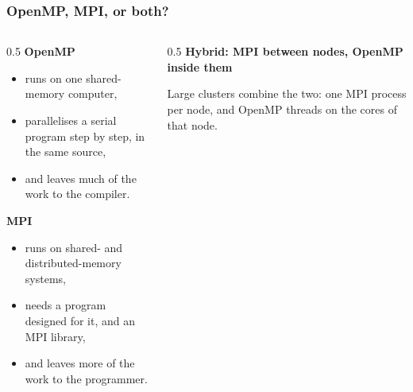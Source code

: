\begin{frame}
  \frametitle{OpenMP, MPI, or both?}
  \begin{columns}[T]
    \begin{column}{0.5\textwidth}
      \textbf{OpenMP}
      \begin{itemize}
        \item runs on one shared-memory computer,
        \item parallelises a serial program step by step, in the same source,
        \item and leaves much of the work to the compiler.
      \end{itemize}

      \textbf{MPI}
      \begin{itemize}
        \item runs on shared- and distributed-memory systems,
        \item needs a program designed for it, and an MPI library,
        \item and leaves more of the work to the programmer.
      \end{itemize}
    \end{column}

    \begin{column}{0.5\textwidth}
      \centering
      \textbf{Hybrid: MPI between nodes, OpenMP inside them}

      \vspace*{3mm}

      \vspace*{3mm}
      \raggedright
      Large clusters combine the two: one MPI process per node, and OpenMP threads on the cores of that node.
    \end{column}
  \end{columns}
\end{frame}


